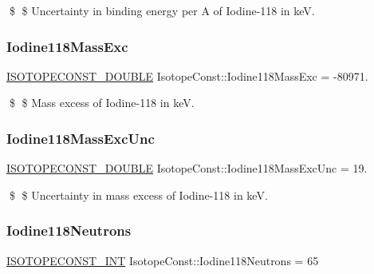 \$ \$ Uncertainty in binding energy per A of Iodine-\/118 in keV. \mbox{\label{group___isotope_const-_iodine-_i118_ga023ae1577b87346dda90b5308dea5f6c}} 
\subsubsection{\texorpdfstring{Iodine118\+Mass\+Exc}{Iodine118MassExc}}
{\footnotesize\ttfamily \mbox{\hyperlink{group___isotope_const-_macros_ga8f45a7272ce02c0b4c65c44636ed719a}{I\+S\+O\+T\+O\+P\+E\+C\+O\+N\+S\+T\+\_\+\+D\+O\+U\+B\+LE}} Isotope\+Const\+::\+Iodine118\+Mass\+Exc = -\/80971.}

\$ \$ Mass excess of Iodine-\/118 in keV. \mbox{\label{group___isotope_const-_iodine-_i118_gac6ba8f3df9e45209f35c626925a0a0b2}} 
\subsubsection{\texorpdfstring{Iodine118\+Mass\+Exc\+Unc}{Iodine118MassExcUnc}}
{\footnotesize\ttfamily \mbox{\hyperlink{group___isotope_const-_macros_ga8f45a7272ce02c0b4c65c44636ed719a}{I\+S\+O\+T\+O\+P\+E\+C\+O\+N\+S\+T\+\_\+\+D\+O\+U\+B\+LE}} Isotope\+Const\+::\+Iodine118\+Mass\+Exc\+Unc = 19.}

\$ \$ Uncertainty in mass excess of Iodine-\/118 in keV. \mbox{\label{group___isotope_const-_iodine-_i118_ga8cfff639f08ac3be85941b30900d17d8}} 
\subsubsection{\texorpdfstring{Iodine118\+Neutrons}{Iodine118Neutrons}}
{\footnotesize\ttfamily \mbox{\hyperlink{group___isotope_const-_macros_ga5f18360b3e99483a35c32d789e62621c}{I\+S\+O\+T\+O\+P\+E\+C\+O\+N\+S\+T\+\_\+\+I\+NT}} Isotope\+Const\+::\+Iodine118\+Neutrons = 65}

